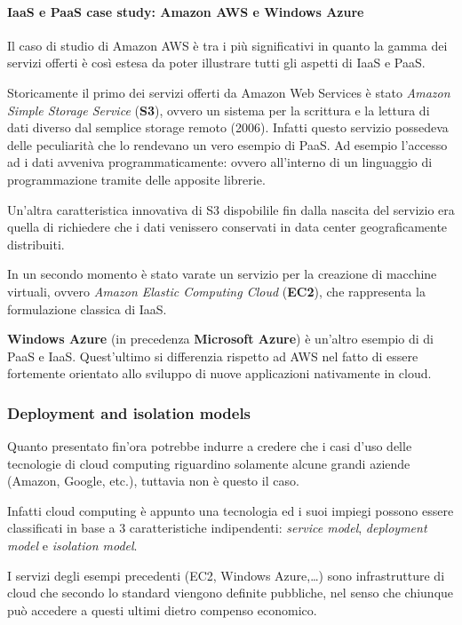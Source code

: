 \documentclass[italian,]{article}
\let\oldparagraph\paragraph
\renewcommand{\paragraph}[1]{\oldparagraph{#1}\mbox{}}
\begin{document}
\paragraph{IaaS e PaaS case study: Amazon AWS e Windows
Azure}\label{iaas-e-paas-case-study-amazon-aws-e-windows-azure}

Il caso di studio di Amazon AWS è tra i più significativi in quanto la
gamma dei servizi offerti è così estesa da poter illustrare tutti gli
aspetti di IaaS e PaaS.

Storicamente il primo dei servizi offerti da Amazon Web Services è stato
\emph{Amazon Simple Storage Service} (\textbf{S3}), ovvero un sistema
per la scrittura e la lettura di dati diverso dal semplice storage
remoto (2006). Infatti questo servizio possedeva delle peculiarità che
lo rendevano un vero esempio di PaaS. Ad esempio l'accesso ad i dati
avveniva programmaticamente: ovvero all'interno di un linguaggio di
programmazione tramite delle apposite librerie.

Un'altra caratteristica innovativa di S3 dispobilile fin dalla nascita
del servizio era quella di richiedere che i dati venissero conservati in
data center geograficamente distribuiti.

In un secondo momento è stato varate un servizio per la creazione di
macchine virtuali, ovvero \emph{Amazon Elastic Computing Cloud}
(\textbf{EC2}), che rappresenta la formulazione classica di IaaS.

\textbf{Windows Azure} (in precedenza \textbf{Microsoft Azure}) è
un'altro esempio di di PaaS e IaaS. Quest'ultimo si differenzia rispetto
ad AWS nel fatto di essere fortemente orientato allo sviluppo di nuove
applicazioni nativamente in cloud.

\subsubsection{Deployment and isolation
models}\label{deployment-and-isolation-models}

Quanto presentato fin'ora potrebbe indurre a credere che i casi d'uso
delle tecnologie di cloud computing riguardino solamente alcune grandi
aziende (Amazon, Google, etc.), tuttavia non è questo il caso.

Infatti cloud computing è appunto una tecnologia ed i suoi impiegi
possono essere classificati in base a 3 caratteristiche indipendenti:
\emph{service model}, \emph{deployment model} e \emph{isolation model}.

I servizi degli esempi precedenti (EC2, Windows Azure,\ldots{}) sono
infrastrutture di cloud che secondo lo standard viengono definite
pubbliche, nel senso che chiunque può accedere a questi ultimi dietro
compenso economico.
\end{document}

